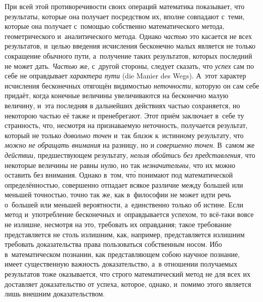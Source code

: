 При всей этой противоречивости своих операций математика показывает, что
результаты, которые она получает посредством их, вполне совпадают с~теми,
которые она получает с~помощью собственно математического метода,
геометрического и~аналитического метода. Однако {\em частью} это
касается не всех результатов, и~целью введения исчисления бесконечно малых
является не только сокращение обычного пути, а~получение таких результатов,
которых последний не может дать. {\em Частью} же, с~другой стороны, следует
сказать, что {\em успех} сам по себе не оправдывает {\em характера пути} (die
Manier des Wegs). А~этот характер исчисления бесконечных отягощён
видимостью {\em неточности,} которую он сам себе придаёт, когда конечные
величины увеличиваются на бесконечно малую величину, и~эта последняя в
дальнейших действиях частью сохраняется, но некоторою частью её также и
пренебрегают. Этот приём заключает в~себе ту странность, что, несмотря на
признаваемую неточность, получается результат, который не только
{\em довольно точен} и~так {\em близок} к~истинному результату, что
{\em можно не обращать внимания} на разницу, но и {\em совершенно точен}.
В~самом же {\em действии,} предшествующем результату,
{\em нельзя обойтись без представления,} что некоторые величины не равны нулю,
но так {\em незначительны,} что их можно оставить без внимания. Однако в~том,
чт\'{о} понимают под математической определённостью, совершенно отпадает всякое
различие между большей или меньшей точностью, точно так же, как в~философии не
может идти речь о~большей или меньшей вероятности, а~единственно только
об истине. Если метод и~употребление бесконечных и~оправдывается успехом, то
всё-таки вовсе не излишне, несмотря на это, требовать их оправдания; такое
требование представляется не столь излишним, как, например, представляется
излишним требовать доказательства права пользоваться собственным
носом. Ибо в~математическом
познании, как представляющем собою научное познание, имеет существенную
важность доказательство, а~в отношении получаемых результатов тоже оказывается,
что строго математический метод не для всех их доставляет доказательство от
успеха, которое, однако, и~помимо этого является лишь внешним доказательством.

